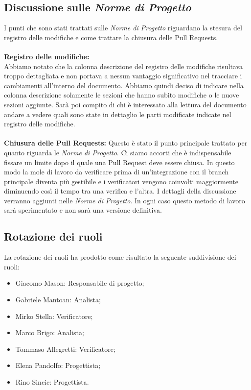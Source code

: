 \subsection{Discussione sulle \textit{Norme di Progetto}}
 I punti che sono stati trattati sulle \textit{Norme di Progetto} riguardano la stesura del registro delle modifiche e come trattare la chiusura delle Pull Requests.
\\\\
\textbf{Registro delle modifiche:}
\\
Abbiamo notato che la colonna descrizione del registro delle modifiche risultava troppo dettagliata e non portava a nessun vantaggio significativo nel tracciare i cambiamenti all'interno del documento.
Abbiamo quindi deciso di indicare nella colonna descrizione solamente le sezioni che hanno subito modifiche o le nuove sezioni aggiunte.
Sarà poi compito di chi è interessato alla lettura del documento andare a vedere quali sono state in dettaglio le parti modificate indicate nel registro delle modifiche.
\\\\
\textbf{Chiusura delle Pull Requests:}
Questo è stato il punto principale trattato per quanto riguarda le \textit{Norme di Progetto}.
Ci siamo accorti che è indispensabile fissare un limite dopo il quale una Pull Request deve essere chiusa.
In questo modo la mole di lavoro da verificare prima di un'integrazione con il branch principale diventa più gestibile e i verificatori vengono coinvolti maggiormente
diminuendo così il tempo tra una verifica e l'altra.
I dettagli della discussione verranno aggiunti nelle \textit{Norme di Progetto}. In ogni caso questo metodo di lavoro sarà sperimentato e non sarà una versione definitiva.
\\
\subsection{Rotazione dei ruoli}
La rotazione dei ruoli ha prodotto come risultato la seguente suddivisione dei ruoli:
\begin{itemize}
    \item Giacomo Mason: Responsabile di progetto;
	\item Gabriele Mantoan: Analista;
	\item Mirko Stella: Verificatore;
	\item Marco Brigo: Analista;
	\item Tommaso Allegretti: Verificatore;
	\item Elena Pandolfo: Progettista;
	\item Rino Sincic: Progettista.
\end{itemize}
